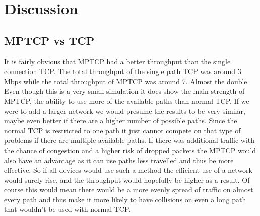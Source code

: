 \documentclass[11pt,twocolumn]{article}
\begin{document}

\section{Discussion}

\subsection{MPTCP vs TCP}
It is fairly obvious that MPTCP had a better throughput than the single connection TCP. The total throughput of the single path TCP was around 3 Mbps while the total throughput of MPTCP was around 7. Almost the double. Even though this is a very small simulation it does show the main strength of MPTCP, the ability to use more of the available paths than normal TCP. If we were to add a larger network we would presume the results to be very similar, maybe even better if there are a higher number of possible paths. Since the normal TCP is restricted to one path it just cannot compete on that type of problems if there are multiple available paths. If there was additional traffic with the chance of congestion and a higher risk of dropped packets the MPTCP would also have an advantage as it can use paths less travelled and thus be more effective. So if all devices would use such a method the efficient use of a network would surely rise, and the throughput would hopefully be higher as a result. Of course this would mean there would be a more evenly spread of traffic on almost every path and thus make it more likely to have collisions on even a long path that wouldn't be used with normal TCP.
\end{document}
